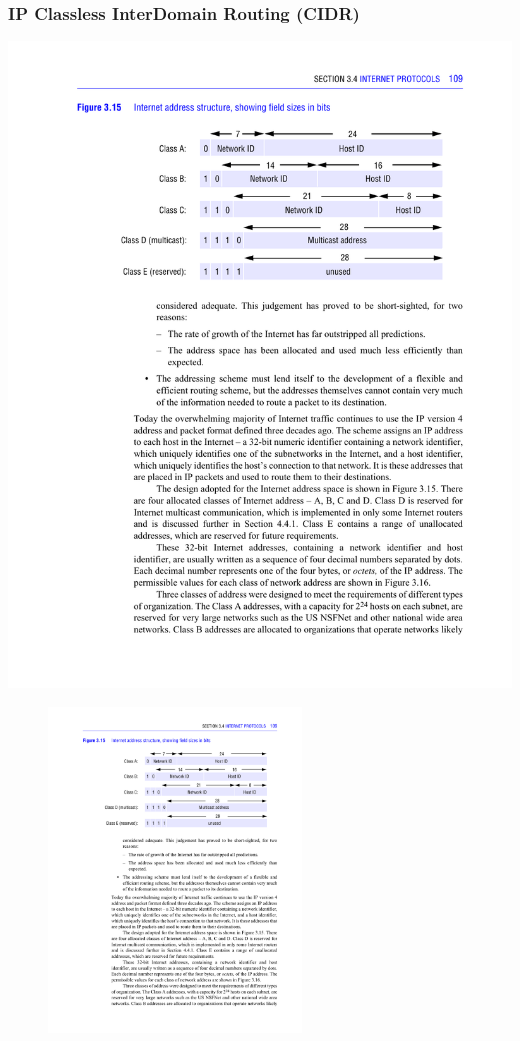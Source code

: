 \documentclass[xcolor=dvipsnames,10pt,compress,aspectratio=169]{beamer}
\begin{document}
\begin{frame}
  \frametitle{IP Classless InterDomain Routing (CIDR)}
{
  \includegraphics[width=\textwidth]{coulouris-03-15}
}
{
  \begin{figure}[ht]
  \centering
  \includegraphics[width=0.6\textwidth]{coulouris-03-15}
  \end{figure}
}
\end{frame}
\end{document}
